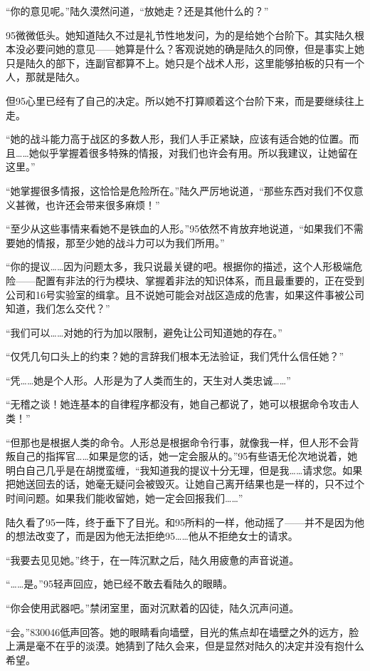 “你的意见呢。”陆久漠然问道，“放她走？还是其他什么的？”

95微微低头。她知道陆久不过是礼节性地发问，为的是给她个台阶下。其实陆久根本没必要问她的意见——她算是什么？客观说她的确是陆久的同僚，但是事实上她只是陆久的部下，连副官都算不上。她只是个战术人形，这里能够拍板的只有一个人，那就是陆久。

但95心里已经有了自己的决定。所以她不打算顺着这个台阶下来，而是要继续往上走。

“她的战斗能力高于战区的多数人形，我们人手正紧缺，应该有适合她的位置。而且……她似乎掌握着很多特殊的情报，对我们也许会有用。所以我建议，让她留在这里。”

“她掌握很多情报，这恰恰是危险所在。”陆久严厉地说道，“那些东西对我们不仅意义甚微，也许还会带来很多麻烦！”

“至少从这些事情来看她不是铁血的人形。”95依然不肯放弃地说道，“如果我们不需要她的情报，那至少她的战斗力可以为我们所用。”

“你的提议……因为问题太多，我只说最关键的吧。根据你的描述，这个人形极端危险——配置有非法的行为模块、掌握着非法的知识体系，而且最重要的，正在受到公司和16号实验室的缉拿。且不说她可能会对战区造成的危害，如果这件事被公司知道，我们怎么交代？”

“我们可以……对她的行为加以限制，避免让公司知道她的存在。”

“仅凭几句口头上的约束？她的言辞我们根本无法验证，我们凭什么信任她？”

“凭……她是个人形。人形是为了人类而生的，天生对人类忠诚……”

“无稽之谈！她连基本的自律程序都没有，她自己都说了，她可以根据命令攻击人类！” 

“但那也是根据人类的命令。人形总是根据命令行事，就像我一样，但人形不会背叛自己的指挥官……如果是您的话，她一定会服从的。”95有些语无伦次地说着，她明白自己几乎是在胡搅蛮缠，“我知道我的提议十分无理，但是我……请求您。如果把她送回去的话，她毫无疑问会被毁灭。让她自己离开结果也是一样的，只不过个时间问题。如果我们能收留她，她一定会回报我们……”

陆久看了95一阵，终于垂下了目光。和95所料的一样，他动摇了——并不是因为他的想法改变了，而是因为他无法拒绝95……他从不拒绝女士的请求。

“我要去见见她。”终于，在一阵沉默之后，陆久用疲惫的声音说道。

“……是。”95轻声回应，她已经不敢去看陆久的眼睛。

“你会使用武器吧。”禁闭室里，面对沉默着的囚徒，陆久沉声问道。

“会。”830046低声回答。她的眼睛看向墙壁，目光的焦点却在墙壁之外的远方，脸上满是毫不在乎的淡漠。她猜到了陆久会来，但是显然对陆久的决定并没有抱什么希望。

